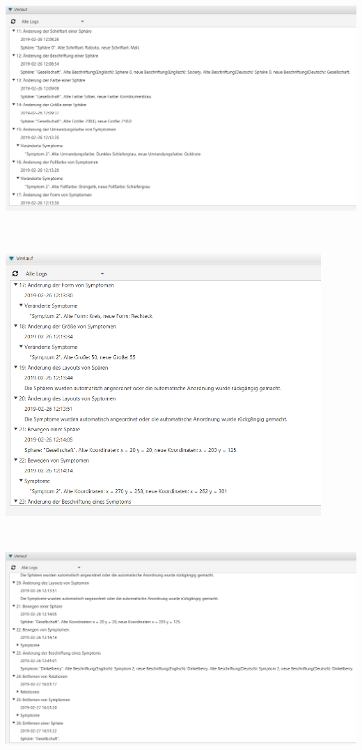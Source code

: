 \documentclass[enabledeprecatedfontcommands]{scrartcl}
\begin{document}
\begin{center}
\includegraphics[height=10cm]{verlauf3.PNG}
\end{center}
\begin{center}
\includegraphics[height=10cm]{verlauf4.PNG}
\end{center}
\begin{center}
\includegraphics[height=9cm]{verlauf5.PNG}
\end{center}
\end{document}

